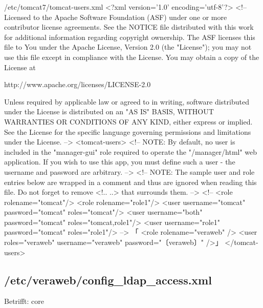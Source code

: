 \begin{lstdump}{/etc/tomcat7/tomcat-users.xml}
<?xml version='1.0' encoding='utf-8'?>
<!--
  Licensed to the Apache Software Foundation (ASF) under one or more
  contributor license agreements.  See the NOTICE file distributed with
  this work for additional information regarding copyright ownership.
  The ASF licenses this file to You under the Apache License, Version 2.0
  (the "License"); you may not use this file except in compliance with
  the License.  You may obtain a copy of the License at

      http://www.apache.org/licenses/LICENSE-2.0

  Unless required by applicable law or agreed to in writing, software
  distributed under the License is distributed on an "AS IS" BASIS,
  WITHOUT WARRANTIES OR CONDITIONS OF ANY KIND, either express or implied.
  See the License for the specific language governing permissions and
  limitations under the License.
-->
<tomcat-users>
<!--
  NOTE:  By default, no user is included in the "manager-gui" role required
  to operate the "/manager/html" web application.  If you wish to use this app,
  you must define such a user - the username and password are arbitrary.
-->
<!--
  NOTE:  The sample user and role entries below are wrapped in a comment
  and thus are ignored when reading this file. Do not forget to remove
  <!.. ..> that surrounds them.
-->
<!--
  <role rolename="tomcat"/>
  <role rolename="role1"/>
  <user username="tomcat" password="tomcat" roles="tomcat"/>
  <user username="both" password="tomcat" roles="tomcat,role1"/>
  <user username="role1" password="tomcat" roles="role1"/>
-->
「  <role rolename="veraweb" />
  <user roles="veraweb" username="veraweb" password="〔veraweb〕" />」
</tomcat-users>
\end{lstdump}

\subsection{/etc/veraweb/config\_ldap\_access.xml}\label{subsec:refcfg-vw-cfgldap}

\ifoa
Betrifft: core
\fi%

